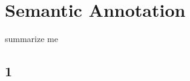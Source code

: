 \chapter{Semantic Annotation}
\label{sec:semannot}

\begin{summary}
summarize me
\end{summary}

\section{1}
\label{sec:semannot:1}
